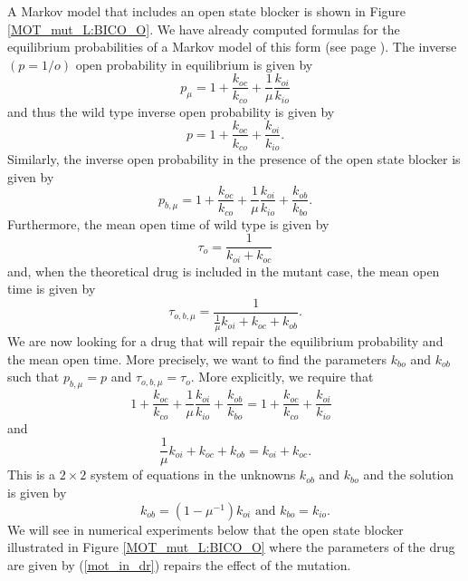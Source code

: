 A Markov model that includes an open state blocker is shown in 
Figure \ref{MOT_mut_L:BICO_O}.
We have already computed
formulas for the equilibrium probabilities of a Markov model of this form (see
page \pageref{Ionchannels_L:BICO}). The inverse $(p=1/o)$ open probability in equilibrium is given by
\[
p_{\mu}=1+\frac{k_{oc}}{k_{co}}+\frac{1}{\mu}\frac{k_{oi}}{k_{io}}
\]
and thus the wild type inverse open probability is given by
\[
p=1+\frac{k_{oc}}{k_{co}}+\frac{k_{oi}}{k_{io}}.
\]
Similarly, the inverse open probability in the presence of the open state blocker 
is given by
\[
p_{b,\mu}=1+\frac{k_{oc}}{k_{co}}+\frac{1}{\mu}\frac{k_{oi}}{k_{io}}+\frac{k_{ob}
}{k_{bo}}.
\]
Furthermore, the mean open time of wild type is given by
\[
\tau_{o}=\frac{1}{k_{oi}+k_{oc}}
\]
and, when the theoretical drug is included in the mutant case, the mean open
time is given by
\[
\tau_{o,b,\mu}=\frac{1}{\frac{1}{\mu}k_{oi}+k_{oc}+k_{ob}}.
\]
We are now looking for a drug that will repair the equilibrium probability and
the mean open time. More precisely, we want to find the parameters $k_{bo}$
and $k_{ob}$ such that $p_{b,\mu}=p$ and $\tau_{o,b,\mu}=\tau_{o}$. More explicitly, we require that
\[
1+\frac{k_{oc}}{k_{co}}+\frac{1}{\mu}\frac{k_{oi}}{k_{io}}+\frac{k_{ob}
}{k_{bo}}=1+\frac{k_{oc}}{k_{co}}+\frac{k_{oi}}{k_{io}}\text{ }
\]
and
\[
\frac{1}{\mu}k_{oi}+k_{oc}+k_{ob}=k_{oi}+k_{oc}.
\]
This is a $2\times 2$ system of equations in the unknowns $k_{ob}$ and $k_{bo}$ and the 
solution is given by
\begin{equation}
k_{ob}=\left(  1-\mu^{-1}\right)  k_{oi}\text{ and }k_{bo}=k_{io}.\label{mot_in_dr}
\end{equation}
We will see in numerical experiments below that the open state blocker
illustrated in Figure  \ref{MOT_mut_L:BICO_O} where the parameters of the drug are given by (\ref{mot_in_dr})
repairs the effect of the mutation.

